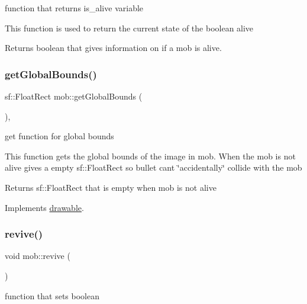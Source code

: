 function that returns is\+\_\+alive variable 

This function is used to return the current state of the boolean alive

\begin{DoxyReturn}{Returns}
boolean that gives information on if a mob is alive. 
\end{DoxyReturn}
\mbox{\label{classmob_af3859378fad2a5f93a1c4d833ff74d5d}} 
\subsubsection{\texorpdfstring{get\+Global\+Bounds()}{getGlobalBounds()}}
{\footnotesize\ttfamily sf\+::\+Float\+Rect mob\+::get\+Global\+Bounds (\begin{DoxyParamCaption}{ }\end{DoxyParamCaption})\hspace{0.3cm}{\ttfamily [override]}, {\ttfamily [virtual]}}



get function for global bounds 

This function gets the global bounds of the image in mob. When the mob is not alive gives a empty sf\+::\+Float\+Rect so bullet can\textquotesingle{}t \char`\"{}accidentally\char`\"{} collide with the mob

\begin{DoxyReturn}{Returns}
sf\+::\+Float\+Rect that is empty when mob is not alive 
\end{DoxyReturn}


Implements \hyperlink{classdrawable_ae013ac0be47538be9ce885d6642daf73}{drawable}.

\mbox{\label{classmob_a3bce6c06653881f8be86fbc60a2b67cb}} 
\subsubsection{\texorpdfstring{revive()}{revive()}}
{\footnotesize\ttfamily void mob\+::revive (\begin{DoxyParamCaption}{ }\end{DoxyParamCaption})}



function that sets boolean 


